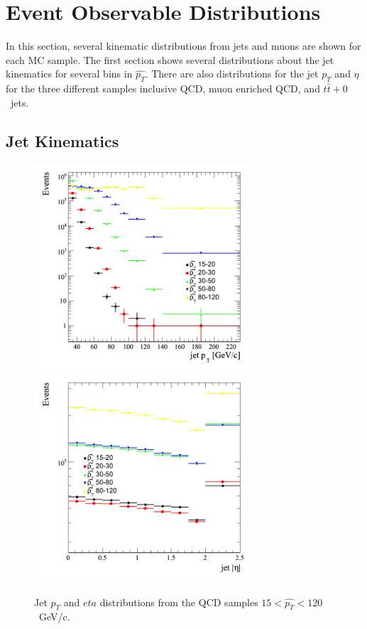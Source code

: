 \section{Event Observable Distributions}
\label{sec:appendix}

In this section, several kinematic distributions from jets and muons 
are shown for each MC sample. The first section shows several 
distributions about the jet kinematics for several bins in $\hat{p_T}$.
There are also distributions for the jet $p_T$ and $\eta$ for the
three different samples inclusive QCD, muon enriched QCD, and
$t\bar{t}+0$~jets.

\subsection{Jet Kinematics}
\begin{figure}[htbp]
  \begin{center}
    \includegraphics[width=80mm]{Figures/jet_ptqcdbinned.png}
    \includegraphics[width=80mm]{Figures/jet_eta_qcdbinned.png}
  \end{center}
  \caption{Jet $p_T$ and $eta$ distributions from the QCD samples $15<\hat{p_T}<120$~GeV/c.}
  \label{fig:jet_pt_QCD}
\end{figure}

